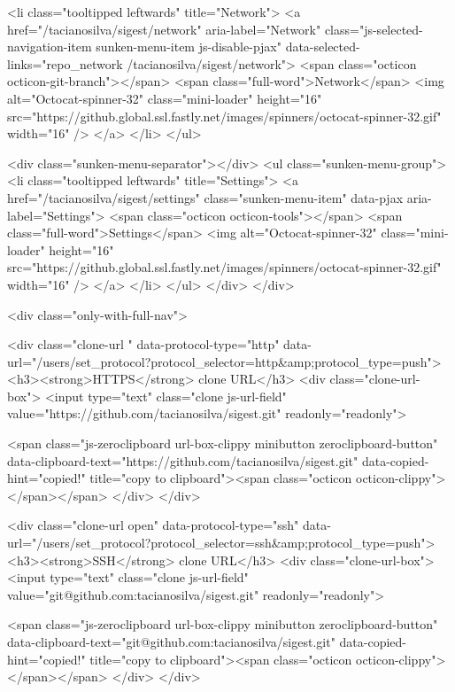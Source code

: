       <li class="tooltipped leftwards" title="Network">
        <a href="/tacianosilva/sigest/network" aria-label="Network" class="js-selected-navigation-item sunken-menu-item js-disable-pjax" data-selected-links="repo_network /tacianosilva/sigest/network">
          <span class="octicon octicon-git-branch"></span> <span class="full-word">Network</span>
          <img alt="Octocat-spinner-32" class="mini-loader" height="16" src="https://github.global.ssl.fastly.net/images/spinners/octocat-spinner-32.gif" width="16" />
</a>      </li>
    </ul>


      <div class="sunken-menu-separator"></div>
      <ul class="sunken-menu-group">
        <li class="tooltipped leftwards" title="Settings">
          <a href="/tacianosilva/sigest/settings"
            class="sunken-menu-item" data-pjax aria-label="Settings">
            <span class="octicon octicon-tools"></span> <span class="full-word">Settings</span>
            <img alt="Octocat-spinner-32" class="mini-loader" height="16" src="https://github.global.ssl.fastly.net/images/spinners/octocat-spinner-32.gif" width="16" />
          </a>
        </li>
      </ul>
  </div>
</div>

            <div class="only-with-full-nav">
              

  

<div class="clone-url "
  data-protocol-type="http"
  data-url="/users/set_protocol?protocol_selector=http&amp;protocol_type=push">
  <h3><strong>HTTPS</strong> clone URL</h3>
  <div class="clone-url-box">
    <input type="text" class="clone js-url-field"
           value="https://github.com/tacianosilva/sigest.git" readonly="readonly">

    <span class="js-zeroclipboard url-box-clippy minibutton zeroclipboard-button" data-clipboard-text="https://github.com/tacianosilva/sigest.git" data-copied-hint="copied!" title="copy to clipboard"><span class="octicon octicon-clippy"></span></span>
  </div>
</div>

  

<div class="clone-url open"
  data-protocol-type="ssh"
  data-url="/users/set_protocol?protocol_selector=ssh&amp;protocol_type=push">
  <h3><strong>SSH</strong> clone URL</h3>
  <div class="clone-url-box">
    <input type="text" class="clone js-url-field"
           value="git@github.com:tacianosilva/sigest.git" readonly="readonly">

    <span class="js-zeroclipboard url-box-clippy minibutton zeroclipboard-button" data-clipboard-text="git@github.com:tacianosilva/sigest.git" data-copied-hint="copied!" title="copy to clipboard"><span class="octicon octicon-clippy"></span></span>
  </div>
</div>

